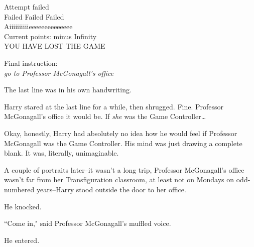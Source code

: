 \begin{writtenNote}
Attempt failed\\
Failed Failed Failed\\
Aiiiiiiiiiieeeeeeeeeeeeee\\
Current points: minus Infinity\\
\MakeUppercase{You have lost the game}

Final instruction:\\
\emph{go to Professor McGonagall's office}
\end{writtenNote}

The last line was in his own handwriting.

Harry stared at the last line for a while, then shrugged. Fine. Professor McGonagall's office it would be. If \emph{she} was the Game Controller{\ldots}

Okay, honestly, Harry had absolutely no idea how he would feel if Professor McGonagall was the Game Controller. His mind was just drawing a complete blank. It was, literally, unimaginable.

A couple of portraits later\---it wasn't a long trip, Professor McGonagall's office wasn't far from her Transfiguration classroom, at least not on Mondays on odd-numbered years\---Harry stood outside the door to her office.

He knocked.

``Come in," said Professor McGonagall's muffled voice.

He entered.

